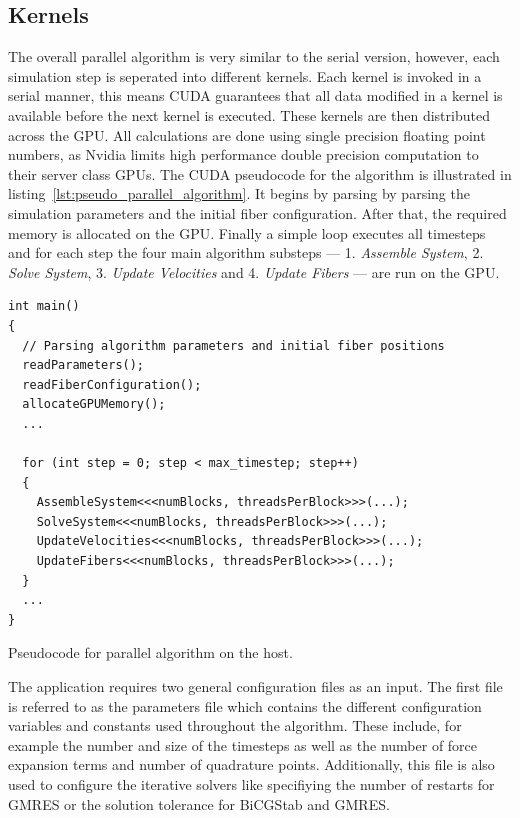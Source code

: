 \documentclass[a4paper,11pt]{kth-mag}
\begin{document}
\subsection{Kernels}
The overall parallel algorithm is very similar to the serial version, however, each simulation step is seperated into different kernels. Each kernel is invoked in a serial manner, this means CUDA guarantees that all data modified in a kernel is available before the next kernel is executed. These kernels are then distributed across the GPU. All calculations are done using single precision floating point numbers, as Nvidia limits high performance double precision computation to their server class GPUs. The CUDA pseudocode for the algorithm is illustrated in listing~\ref{lst:pseudo_parallel_algorithm}. It begins by parsing by parsing the simulation parameters and the initial fiber configuration. After that, the required memory is allocated on the GPU. Finally a simple loop executes all timesteps and for each step the four main algorithm substeps — 1. \emph{Assemble System}, 2. \emph{Solve System}, 3. \emph{Update Velocities} and 4. \emph{Update Fibers} — are run on the GPU.

\begin{listing}
  \centering
  \begin{verbatim}
int main()
{
  // Parsing algorithm parameters and initial fiber positions
  readParameters();
  readFiberConfiguration();
  allocateGPUMemory();
  ...

  for (int step = 0; step < max_timestep; step++)
  {
    AssembleSystem<<<numBlocks, threadsPerBlock>>>(...);
    SolveSystem<<<numBlocks, threadsPerBlock>>>(...);
    UpdateVelocities<<<numBlocks, threadsPerBlock>>>(...);
    UpdateFibers<<<numBlocks, threadsPerBlock>>>(...);
  }
  ...
}
  \end{verbatim}
  \caption{Pseudocode for parallel algorithm on the host.}
  \label{lst:pseudo_parallel_algorithm}
\end{listing}

The application requires two general configuration files as an input. The first file is referred to as the parameters file which contains the different configuration variables and constants used throughout the algorithm. These include, for example the number and size of the timesteps as well as the number of force expansion terms and number of quadrature points. Additionally, this file is also used to configure the iterative solvers like specifiying the number of restarts for GMRES or the solution tolerance for BiCGStab and GMRES.
\end{document}
